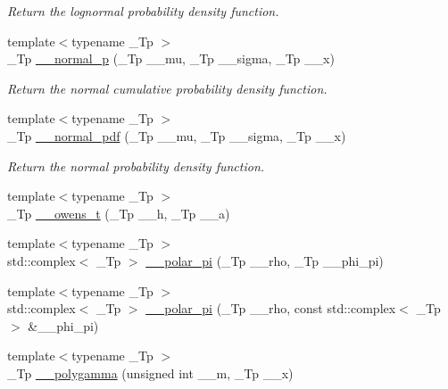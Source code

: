 \begin{DoxyCompactItemize}
\begin{DoxyCompactList}\small\item\em Return the lognormal probability density function. \end{DoxyCompactList}\item 
{\footnotesize template$<$typename \+\_\+\+Tp $>$ }\\\+\_\+\+Tp \hyperlink{namespacestd_1_1____detail_a4a088c2e6ddea7db99af9d114bf31b46}{\+\_\+\+\_\+normal\+\_\+p} (\+\_\+\+Tp \+\_\+\+\_\+mu, \+\_\+\+Tp \+\_\+\+\_\+sigma, \+\_\+\+Tp \+\_\+\+\_\+x)
\begin{DoxyCompactList}\small\item\em Return the normal cumulative probability density function. \end{DoxyCompactList}\item 
{\footnotesize template$<$typename \+\_\+\+Tp $>$ }\\\+\_\+\+Tp \hyperlink{namespacestd_1_1____detail_a6211a0741c8e2dfb219fb52d072295f4}{\+\_\+\+\_\+normal\+\_\+pdf} (\+\_\+\+Tp \+\_\+\+\_\+mu, \+\_\+\+Tp \+\_\+\+\_\+sigma, \+\_\+\+Tp \+\_\+\+\_\+x)
\begin{DoxyCompactList}\small\item\em Return the normal probability density function. \end{DoxyCompactList}\item 
{\footnotesize template$<$typename \+\_\+\+Tp $>$ }\\\+\_\+\+Tp \hyperlink{namespacestd_1_1____detail_a5b50a9d8beaca5a637c8293ab01bf124}{\+\_\+\+\_\+owens\+\_\+t} (\+\_\+\+Tp \+\_\+\+\_\+h, \+\_\+\+Tp \+\_\+\+\_\+a)
\item 
{\footnotesize template$<$typename \+\_\+\+Tp $>$ }\\std\+::complex$<$ \+\_\+\+Tp $>$ \hyperlink{namespacestd_1_1____detail_ac69e259ad511fcc7a54c6ec315adcfa4}{\+\_\+\+\_\+polar\+\_\+pi} (\+\_\+\+Tp \+\_\+\+\_\+rho, \+\_\+\+Tp \+\_\+\+\_\+phi\+\_\+pi)
\item 
{\footnotesize template$<$typename \+\_\+\+Tp $>$ }\\std\+::complex$<$ \+\_\+\+Tp $>$ \hyperlink{namespacestd_1_1____detail_a627c0e19f6b3e90af25735f351662d53}{\+\_\+\+\_\+polar\+\_\+pi} (\+\_\+\+Tp \+\_\+\+\_\+rho, const std\+::complex$<$ \+\_\+\+Tp $>$ \&\+\_\+\+\_\+phi\+\_\+pi)
\item 
{\footnotesize template$<$typename \+\_\+\+Tp $>$ }\\\+\_\+\+Tp \hyperlink{namespacestd_1_1____detail_a25cc1b7c8adbc3b0fc8d4487ab23571c}{\+\_\+\+\_\+polygamma} (unsigned int \+\_\+\+\_\+m, \+\_\+\+Tp \+\_\+\+\_\+x)

\end{DoxyCompactItemize}
